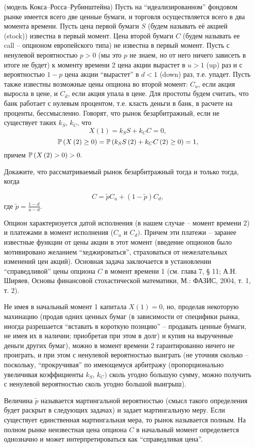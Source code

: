 \begin{problem}(модель Кокса--Росса--Рубинштейна) 
\label{sec:levilong}
Пусть на ``идеализированном'' фондовом рынке имеется всего две ценные 
бумаги, и торговля осуществляется всего в два момента времени. Пусть цена 
первой бумаги $S$ (будем называть её акцией (stock)) известна в первый 
момент. Цена второй бумаги $C$ (будем называть ее call -- опционом 
европейского типа) не известна в первый момент. Пусть с ненулевой 
вероятностью $p>0$ (мы это $p$ не знаем, но от него ничего зависеть в итоге 
не будет) к моменту времени 2 цена акции вырастет в $u>1$ (up) раз и с 
вероятностью $1-p$ цена акции ``вырастет'' в $d<1$ (down) раз, т.е. упадет. 
Пусть также известны возможные цены опциона во второй момент: $C_u $, если 
акция выросла в цене, и $C_d $,  если акция упала в цене. Для простоты будем 
считать, что банк работает с нулевым процентом, т.е. класть деньги в банк, в 
расчете на проценты, бессмысленно. Говорят, что рынок 
безарбитражный, если не существует таких $k_S $, $k_C $, что
\[
X\left( 1 \right)=k_S S+k_C C=0,
\]
\[
\mathrm{{\mathbb P}}\left( {X\left( 2 \right)\ge 0} \right)=\mathrm{{\mathbb P}}\left( {k_S S\left( 2 \right)+k_C 
C\left( 2 \right)\ge 0} \right)=1,\] причем $\mathrm{{\mathbb P}}\left( {X\left( 2 \right)>0} 
\right)>0.
$

Докажите, что рассматриваемый рынок безарбитражный тогда и только тогда, 
когда

$$C=\tilde {p}C_u +\left( {1-\tilde {p}} \right)C_d ,$$ где $\tilde 
{p}=\frac{1-d}{u-d}$.
\end{problem}
\begin{remark}
 Опцион характеризуется датой исполнения (в нашем 
случае -- момент времени 2) и платежами в момент исполнения ($C_u $ и $C_d 
)$. Причем эти платежи -- заранее известные функции от цены акции в этот 
момент (введение опционов было мотивировано желанием ``хеджироваться'', 
страховаться от нежелательных изменений цен акций). Основная задача 
заключается в установлении ``справедливой'' цены опциона $C$ в момент 
времени 1 (см. \cite{21} глава 7, {\S} 
11; А.Н. Ширяев, Основы финансовой стохастической математики, М.: ФАЗИС, 
2004, т. 1, т. 2).

Не 
имея в начальный момент 1 капитала $X\left( 1 \right)=0$, но, проделав 
некоторую махинацию (продав одних ценных бумаг (в зависимости от специфики 
рынка, иногда разрешается ``вставать в короткую позицию'' -- продавать 
ценные бумаги, не имея их в наличии; приобретая при этом в долг) и купив на 
вырученные деньги других бумаг), можно в момент времени 2 гарантированно 
ничего не проиграть, и при этом с ненулевой вероятностью выиграть (не 
уточняя сколько -- поскольку, ``прокручивая'' по имеющемуся арбитражу 
(пропорционально увеличивая коэффициенты $k_S $, $k_C )$ сколь угодно 
большую сумму, можно получить с ненулевой вероятностью сколь угодно большой 
выигрыш).

Величина $\tilde {p}$ называется мартингальной вероятностью (смысл 
такого определения будет раскрыт в следующих задачах) и задает мартингальную 
меру. Если существует единственная мартингальная мера, то рынок называется 
полным. На полном рынке неизвестная цена опциона $C$ в начальный 
момент определяется однозначно и может интерпретироваться как ``справедливая 
цена''.
\end{remark}
